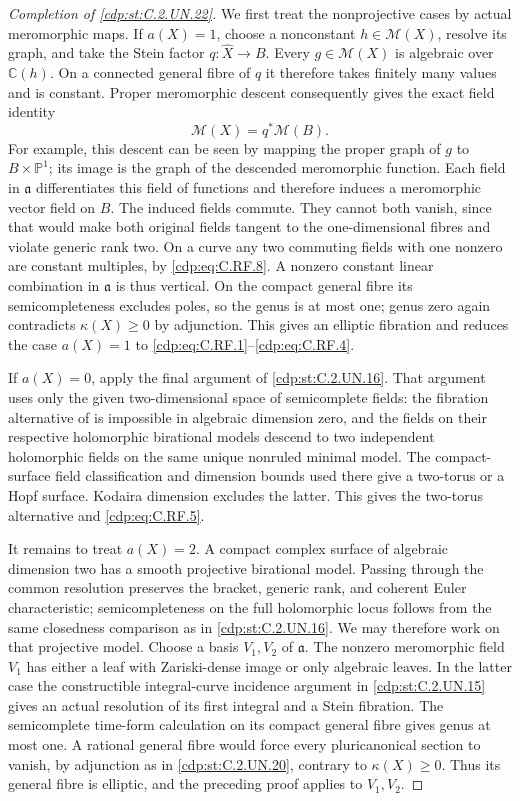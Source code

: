 \begin{proof}[Completion of \ref{cdp:st:C.2.UN.22}]
We first treat the nonprojective cases by actual
meromorphic maps. If $a(X)=1$, choose a nonconstant
$h\in\mathcal M(X)$, resolve its graph, and take the
Stein factor $q:\widehat X\to B$. Every
$g\in\mathcal M(X)$ is algebraic over $\mathbb C(h)$.
On a connected general fibre of $q$ it therefore takes
finitely many values and is constant. Proper meromorphic
descent consequently gives the exact field identity
\[
                       \mathcal M(X)=q^*\mathcal M(B).
                                                               \tag{C.RF.9}\label{cdp:eq:C.RF.9}
\]
For example, this descent can be seen by mapping the
proper graph of $g$ to $B\times\mathbb P^1$; its image
is the graph of the descended meromorphic function.
Each field in $\mathfrak a$ differentiates this field
of functions and therefore induces a meromorphic vector
field on $B$. The induced fields commute. They cannot
both vanish, since that would make both original fields
tangent to the one-dimensional fibres and violate
generic rank two. On a curve any two commuting fields
with one nonzero are constant multiples, by \eqref{cdp:eq:C.RF.8}.
A nonzero constant linear combination in $\mathfrak a$
is thus vertical. On the compact general fibre its
semicompleteness excludes poles, so the genus is at most
one; genus zero again contradicts $\kappa(X)\ge0$ by
adjunction. This gives an elliptic fibration and reduces
the case $a(X)=1$ to \eqref{cdp:eq:C.RF.1}--\eqref{cdp:eq:C.RF.4}.

If $a(X)=0$, apply the final argument of \ref{cdp:st:C.2.UN.16}.
That argument uses only the given two-dimensional
space of semicomplete fields: the fibration alternative
of \cite[Theorem~9.2]{Guillot2024} is impossible in
algebraic dimension zero, and the fields on their
respective holomorphic birational models descend to
two independent holomorphic fields on the same unique
nonruled minimal model. The compact-surface field
classification and dimension bounds used there give
a two-torus or a Hopf surface. Kodaira dimension
excludes the latter. This gives the two-torus alternative
and \eqref{cdp:eq:C.RF.5}.

It remains to treat $a(X)=2$. A compact complex surface
of algebraic dimension two has a smooth projective
birational model. Passing through the common resolution
preserves the bracket, generic rank, and coherent Euler
characteristic; semicompleteness on the full holomorphic
locus follows from the same closedness comparison as in
\ref{cdp:st:C.2.UN.16}. We may therefore work on that projective model.
Choose a basis $V_1,V_2$ of $\mathfrak a$. The nonzero
meromorphic field $V_1$ has either a leaf with Zariski-dense
image or only algebraic leaves. In the latter case the
constructible integral-curve incidence argument in
\ref{cdp:st:C.2.UN.15} gives an actual resolution of its first integral
and a Stein fibration. The semicomplete time-form calculation
on its compact general fibre gives genus at most one.
A rational general fibre would force every pluricanonical
section to vanish, by adjunction as in \ref{cdp:st:C.2.UN.20}, contrary
to $\kappa(X)\ge0$. Thus its general fibre is elliptic,
and the preceding proof applies to $V_1,V_2$.


\end{proof}
